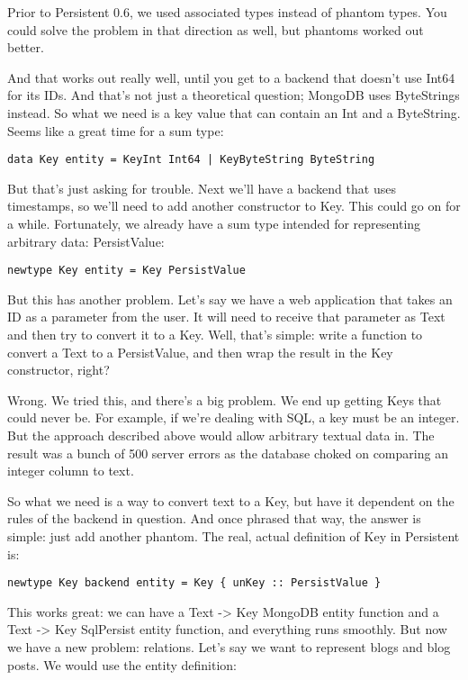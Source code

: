 Prior to Persistent 0.6, we used associated types instead of phantom types. You could solve the problem in that direction as well, but phantoms worked out better.

And that works out really well, until you get to a backend that doesn't use Int64 for its IDs. And that's not just a theoretical question; MongoDB uses ByteStrings instead. So what we need is a key value that can contain an Int and a ByteString. Seems like a great time for a sum type:

\begin{lstlisting}
data Key entity = KeyInt Int64 | KeyByteString ByteString
\end{lstlisting}

But that's just asking for trouble. Next we'll have a backend that uses timestamps, so we'll need to add another constructor to Key. This could go on for a while. Fortunately, we already have a sum type intended for representing arbitrary data: PersistValue:

\begin{lstlisting}
newtype Key entity = Key PersistValue
\end{lstlisting}

But this has another problem. Let's say we have a web application that takes an ID as a parameter from the user. It will need to receive that parameter as Text and then try to convert it to a Key. Well, that's simple: write a function to convert a Text to a PersistValue, and then wrap the result in the Key constructor, right?

Wrong. We tried this, and there's a big problem. We end up getting Keys that could never be. For example, if we're dealing with SQL, a key must be an integer. But the approach described above would allow arbitrary textual data in. The result was a bunch of 500 server errors as the database choked on comparing an integer column to text.

So what we need is a way to convert text to a Key, but have it dependent on the rules of the backend in question. And once phrased that way, the answer is simple: just add another phantom. The real, actual definition of Key in Persistent is:

\begin{lstlisting}
newtype Key backend entity = Key { unKey :: PersistValue }
\end{lstlisting}

This works great: we can have a Text -> Key MongoDB entity function and a Text -> Key SqlPersist entity function, and everything runs smoothly. But now we have a new problem: relations. Let's say we want to represent blogs and blog posts. We would use the entity definition:

